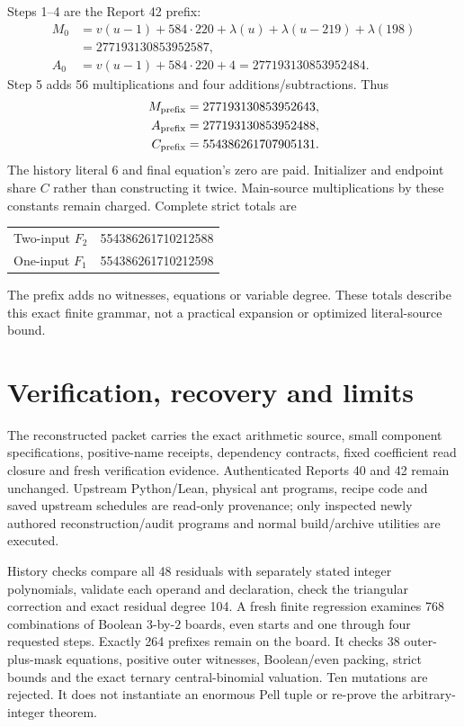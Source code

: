 \documentclass[11pt,letterpaper]{article}
\theoremstyle{definition}\newtheorem{definition}[theorem]{Definition}
\theoremstyle{remark}\newtheorem{remark}[theorem]{Remark}
\begin{document}
Steps 1--4 are the Report 42 prefix:
\begin{align*}
 M_0&=v(u-1)+584\cdot220+\lambda(u)+\lambda(u-219)+\lambda(198)\\
 &=277193130853952587,\\
 A_0&=v(u-1)+584\cdot220+4=277193130853952484.
\end{align*}
Step 5 adds 56 multiplications and four additions/subtractions. Thus
\begin{align*}
 M_{\rm prefix}&=277193130853952643,\\
 A_{\rm prefix}&=277193130853952488,\\
 C_{\rm prefix}&=554386261707905131.
\end{align*}
The history literal 6 and final equation's zero are paid. Initializer and endpoint share $C$ rather than constructing it twice. Main-source multiplications by these constants remain charged. Complete strict totals are
\begin{center}
\begin{tabular}{@{}lr@{}}\toprule
Two-input $F_2$&554386261710212588\\
One-input $F_1$&554386261710212598\\\bottomrule
\end{tabular}\end{center}
The prefix adds no witnesses, equations or variable degree. These totals describe this exact finite grammar, not a practical expansion or optimized literal-source bound.

\section{Verification, recovery and limits}\label{ptr:pc:sec:verification}
The reconstructed packet carries the exact arithmetic source, small component specifications, positive-name receipts, dependency contracts, fixed coefficient read closure and fresh verification evidence. Authenticated Reports 40 and 42 remain unchanged. Upstream Python/Lean, physical ant programs, recipe code and saved upstream schedules are read-only provenance; only inspected newly authored reconstruction/audit programs and normal build/archive utilities are executed.

History checks compare all 48 residuals with separately stated integer polynomials, validate each operand and declaration, check the triangular correction and exact residual degree 104. A fresh finite regression examines 768 combinations of Boolean $3$-by-$2$ boards, even starts and one through four requested steps. Exactly 264 prefixes remain on the board. It checks 38 outer-plus-mask equations, positive outer witnesses, Boolean/even packing, strict bounds and the exact ternary central-binomial valuation. Ten mutations are rejected. It does not instantiate an enormous Pell tuple or re-prove the arbitrary-integer theorem.
\end{document}
